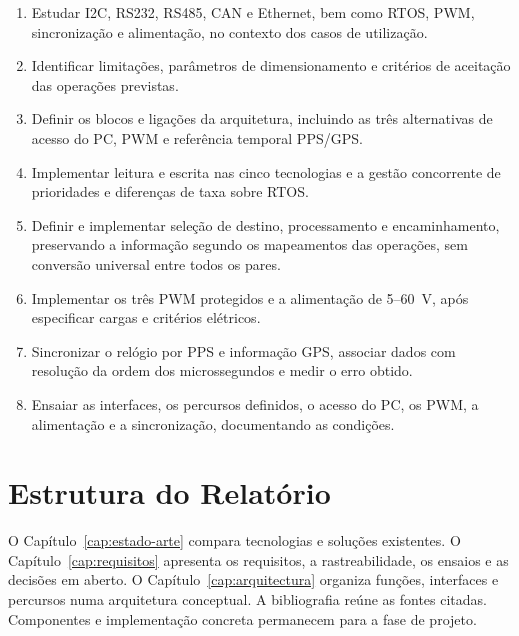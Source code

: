 \begingroup
{}
\begin{enumerate}
\setlength{\itemsep}{2pt}
    \item \label{obj:estudo-tecnologias}
    Estudar I2C, RS232, RS485, CAN e Ethernet, bem como RTOS, PWM,
    sincronização e alimentação, no contexto dos casos de utilização.
    \item \label{obj:analise-limitacoes}
    Identificar limitações, parâmetros de dimensionamento e critérios
    de aceitação das operações previstas.
    \item \label{obj:arquitetura}
    Definir os blocos e ligações da arquitetura, incluindo as três
    alternativas de acesso do PC, PWM e referência temporal PPS/GPS.
    \item \label{obj:comunicacao}
    Implementar leitura e escrita nas cinco tecnologias e a gestão
    concorrente de prioridades e diferenças de taxa sobre RTOS.
    \item \label{obj:processamento-encaminhamento}
    Definir e implementar seleção de destino, processamento e
    encaminhamento, preservando a informação segundo os mapeamentos
    das operações, sem conversão universal entre todos os pares.
    \item \label{obj:atuacao-alimentacao}
    Implementar os três PWM protegidos e a alimentação de 5--60~V,
    após especificar cargas e critérios elétricos.
    \item \label{obj:sincronizacao}
    Sincronizar o relógio por PPS e informação GPS, associar dados
    com resolução da ordem dos microssegundos e medir o erro obtido.
    \item \label{obj:validacao}
    Ensaiar as interfaces, os percursos definidos, o acesso do PC,
    os PWM, a alimentação e a sincronização, documentando as condições.
\end{enumerate}
\endgroup

\section{Estrutura do Relatório}

O Capítulo~\ref{cap:estado-arte} compara tecnologias e soluções existentes.
O Capítulo~\ref{cap:requisitos} apresenta os requisitos, a rastreabilidade,
os ensaios e as decisões em aberto. O Capítulo~\ref{cap:arquitectura}
organiza funções, interfaces e percursos numa arquitetura conceptual.
A bibliografia reúne as fontes citadas. Componentes e implementação
concreta permanecem para a fase de projeto.
